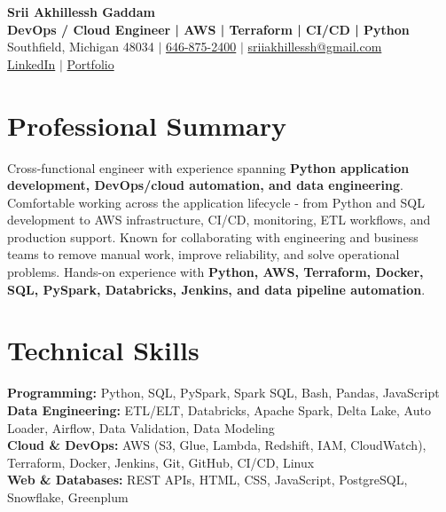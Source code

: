 \documentclass[letterpaper,10pt]{article}
\begin{document}
\fontsize{9.35pt}{10.45pt}\selectfont

\begin{center}
    {\LARGE \textbf{Srii Akhillessh Gaddam}} \\[-1pt]
    \textbf{DevOps / Cloud Engineer | AWS | Terraform | CI/CD | Python} \\[2pt]
    Southfield, Michigan 48034 $|$
    \href{tel:6468752400}{646-875-2400} $|$
    \href{mailto:sriiakhillessh@gmail.com}{sriiakhillessh@gmail.com} \\[1pt]
    \href{https://www.linkedin.com/in/srii-akhiilessh-gaddam-b48668191/}{LinkedIn} $|$
    \href{https://sriiakhillesshg.github.io/portfolio/}{Portfolio}
\end{center}
\vspace{-8pt}

\section{Professional Summary}
\small{Cross-functional engineer with experience spanning \textbf{Python application development, DevOps/cloud automation, and data engineering}. Comfortable working across the application lifecycle - from Python and SQL development to AWS infrastructure, CI/CD, monitoring, ETL workflows, and production support. Known for collaborating with engineering and business teams to remove manual work, improve reliability, and solve operational problems. Hands-on experience with \textbf{Python, AWS, Terraform, Docker, SQL, PySpark, Databricks, Jenkins, and data pipeline automation}.}

\section{Technical Skills}
\small{
\textbf{Programming:} Python, SQL, PySpark, Spark SQL, Bash, Pandas, JavaScript \\
\textbf{Data Engineering:} ETL/ELT, Databricks, Apache Spark, Delta Lake, Auto Loader, Airflow, Data Validation, Data Modeling \\
\textbf{Cloud \& DevOps:} AWS (S3, Glue, Lambda, Redshift, IAM, CloudWatch), Terraform, Docker, Jenkins, Git, GitHub, CI/CD, Linux \\
\textbf{Web \& Databases:} REST APIs, HTML, CSS, JavaScript, PostgreSQL, Snowflake, Greenplum
}
\end{document}
